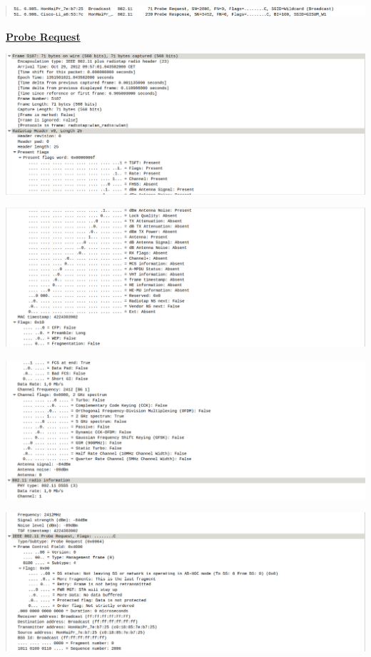 \documentclass{article}
\begin{document}
\begin{center}
\includegraphics[scale=0.3]{WLAN/probes.png}
\end{center}

\textbf{\underline{Probe Request}}

\begin{center}
\includegraphics[scale=0.3]{WLAN/probreq1.png}
\end{center}
\begin{center}
\includegraphics[scale=0.3]{WLAN/probreq2.png}
\end{center}
\begin{center}
\includegraphics[scale=0.3]{WLAN/probreq3.png}
\end{center}
\begin{center}
\includegraphics[scale=0.3]{WLAN/probreq4.png}
\end{center}
\end{document}
